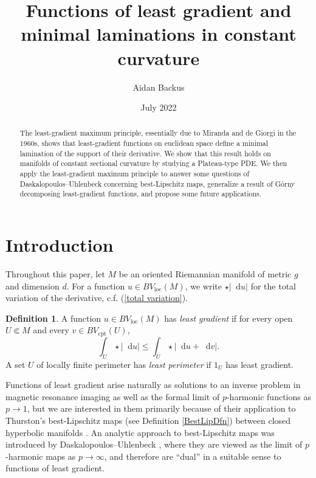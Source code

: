 \documentclass[reqno,10pt]{amsart}
\title{Functions of least gradient and minimal laminations in constant curvature}
\author{Aidan Backus}
\date{July 2022}
\newcommand*\dif{\mathop{}\!\mathrm{d}}
\newcommand{\dfn}[1]{\emph{#1}\index{#1}}
\newcommand{\loc}{\mathrm{loc}}
\newcommand{\cpt}{\mathrm{cpt}}
\theoremstyle{definition}
\newtheorem{definition}[theorem]{Definition}
\numberwithin{equation}{section}
\begin{document}
\begin{abstract}
The least-gradient maximum principle, essentially due to Miranda and de Giorgi in the 1960s, shows that least-gradient functions on euclidean space define a minimal lamination of the support of their derivative.
We show that this result holds on manifolds of constant sectional curvature by studying a Plateau-type PDE.
We then apply the least-gradient maximum principle to answer some questions of Daskalopoulos--Uhlenbeck concerning best-Lipschitz maps, generalize a result of G\'orny decomposing least-gradient functions, and propose some future applications.
\end{abstract}

\maketitle



\section{Introduction}
Throughout this paper, let $M$ be an oriented Riemannian manifold of metric $g$ and dimension $d$.
For a function $u \in BV_\loc(M)$, we write $\star |\dif u|$ for the total variation of the derivative, c.f. (\ref{total variation}).

\begin{definition}\label{main definitions}
A function $u \in BV_\loc(M)$ has \dfn{least gradient} if for every open $U \Subset M$ and every $v \in BV_\cpt(U)$,
\begin{equation}\label{least gradient functional}
\int_U \star |\dif u| \leq \int_U \star |\dif u + \dif v|.
\end{equation}
A set $U$ of locally finite perimeter has \dfn{least perimeter} if $1_U$ has least gradient.
\end{definition}

Functions of least gradient arise naturally as solutions to an inverse problem in magnetic resonance imaging \cite{Nachman2009, Tamasan2019, Joy09} as well as the formal limit of $p$-harmonic functions as $p \to 1$, but we are interested in them primarily because of their application to Thurston's best-Lipschitz maps (see Definition \ref{BestLipDfn}) between closed hyperbolic manifolds \cite{thurston1998minimal}.
An analytic approach to best-Lipschitz maps was introduced by Daskalopoulos--Uhlenbeck \cite{daskalopoulos2020transverse, daskalopoulosPrep1}, where they are viewed as the limit of $p$-harmonic maps as $p \to \infty$, and therefore are ``dual'' in a suitable sense to functions of least gradient.
\end{document}
